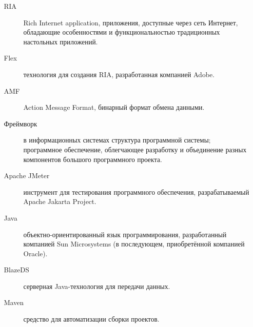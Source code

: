 \Abbreviations %
\begin{description}
\item[RIA] Rich Internet application, приложения, доступные через сеть Интернет, обладающие особенностями и
функциональностью традиционных настольных приложений.
\item[Flex] технология для создания RIA, разработанная компанией Adobe.
\item[AMF] Action Message Format, бинарный формат обмена данными.
\item[Фреймворк] в информационных системах структура программной системы; программное обеспечение, облегчающее
разработку и объединение разных компонентов большого программного проекта.
\item[Apache JMeter] инструмент для тестирования программного обеспечения, разрабатываемый Apache Jakarta Project.
\item[Java] объектно-ориентированный язык программирования, разработанный компанией Sun Microsystems
(в последующем, приобретённой компанией Oracle).
\item[BlazeDS] серверная Java-технология для передачи данных.
\item[Maven] средство для автоматизации сборки проектов.
\end{description}
